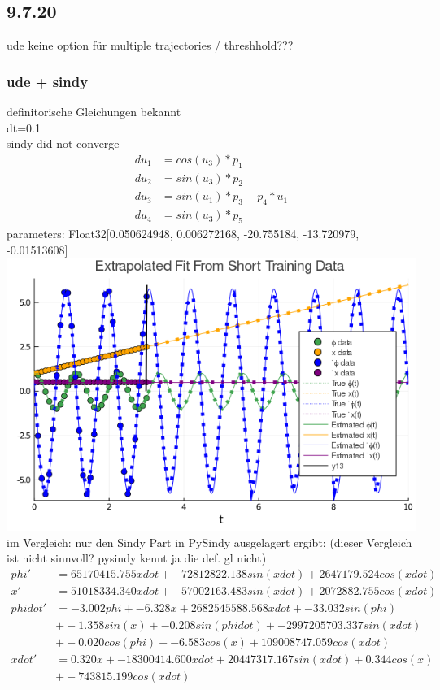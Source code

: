\documentclass[arbeit=studie,oneside,BCOR=12mm]{ArbeitRST}
\begin{document}
\subsection{9.7.20}
ude keine option für multiple trajectories / threshhold???
\subsubsection{ude + sindy}
definitorische Gleichungen bekannt\\
dt=0.1\\
sindy did not converge
\begin{align}
du_1 &= cos(u_3) * p_1\\
du_2 &= sin(u_3) * p_2\\
du_3 &= sin(u_1) * p_3 + p_4 * u_1\\
du_4 &= sin(u_3) * p_5
\end{align}
parameters: Float32[0.050624948, 0.006272168, -20.755184, -13.720979, -0.01513608]
\includegraphics[width=1\textwidth]{images/ude_ident_with_prior_knowledge}
im Vergleich: nur den Sindy Part in PySindy ausgelagert ergibt: (dieser Vergleich ist nicht sinnvoll? pysindy kennt ja die def. gl nicht)
\begin{align*}
phi' &= 65170415.755 xdot + -72812822.138 sin(xdot) + 2647179.524 cos(xdot)\\
x' &= 51018334.340 xdot + -57002163.483 sin(xdot) + 2072882.755 cos(xdot)\\
phidot' &= -3.002 phi + -6.328 x + 2682545588.568 xdot + -33.032 sin(phi) \\&+ -1.358 sin(x) + -0.208 sin(phidot) + -2997205703.337 sin(xdot) \\&+ -0.020 cos(phi) + -6.583 cos(x) + 109008747.059 cos(xdot)\\
xdot' &= 0.320 x + -18300414.600 xdot + 20447317.167 sin(xdot) + 0.344 cos(x) \\&+ -743815.199 cos(xdot)
\end{align*}
\end{document}
